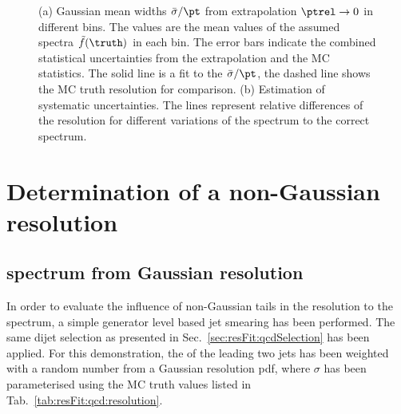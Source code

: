 \documentclass[a4paper]{cmspaper} %
\begin{document}
\begin{figure}[ht]
  \begin{center}
     
  \end{center}
  \caption{(a) Gaussian mean widths $\bar{\sigma}/\pt$ from extrapolation \mbox{$\ptrel\rightarrow0$} in different \pt bins.
  The \pt values are the mean values of the assumed spectra $\tilde{f}(\truth)$ in each bin.
  The error bars indicate the combined statistical uncertainties from the extrapolation and the MC statistics.
  The solid line is a fit to the $\bar{\sigma}/\pt$, the dashed line shows the MC truth resolution for comparison.
  (b) Estimation of systematic uncertainties.
  The lines represent relative differences of the resolution for different variations of the spectrum to the correct spectrum.}
\end{figure}
\clearpage


\section{Determination of a non-Gaussian resolution}

\subsection{\mht spectrum from Gaussian resolution}
In order to evaluate the influence of non-Gaussian tails in the resolution to the \mht spectrum, a simple generator level based jet smearing has been performed.
The same dijet selection as presented in Sec.~\ref{sec:resFit:qcdSelection} has been applied.
For this demonstration, the \ptpart of the leading two jets has been weighted with a random number from a Gaussian resolution pdf, where $\sigma$ has been parameterised using the MC truth values listed in Tab.~\ref{tab:resFit:qcd:resolution}.
\end{document}
